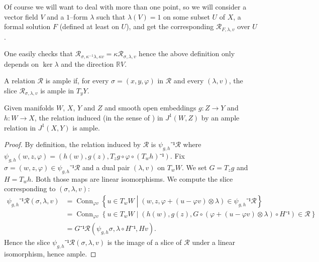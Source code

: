 \documentclass[10pt,a4paper]{article}
\newcommand{\Rel}{\mathcal{R}} %
\DeclareMathOperator{\Conn}{Conn} %
\newcommand{\uses}[1]{}
\newcommand{\lean}[1]{}
\newcommand{\leanok}{}
\begin{document}
Of course we will want to deal with more than one point, so we will consider a
vector field $V$ and a $1$--form $λ$ such that $λ(V) = 1$ on some subset $U$ of
$X$, a formal solution $F$ (defined at least on $U$), and get the corresponding
$\Rel_{F, λ, v}$ over $U$.

One easily checks that $\Rel_{σ, κ^{-1}λ, κv} = κ\Rel_{σ, λ, v}$ hence the above
definition only depends on $\ker λ$ and the direction $ℝV$.

\begin{definition}
  \label{def:ample_relation}
  \uses{def:one_jet_space, def:ample_subset}
  \leanok
  \lean{RelMfld.Ample}
  A relation $\Rel$ is ample if, for every $σ = (x, y, φ)$ in $\Rel$ and every
  $(λ, v)$, the slice $\Rel_{σ, λ, v}$ is ample in $T_yY$.
\end{definition}

\begin{lemma}
  \label{lem:ample_iff_loc}
  \uses{def:ample_relation, def:transfer_map}
  \leanok
  \lean{RelMfld.Ample.localize}
  Given manifolds $W$, $X$, $Y$ and $Z$ and smooth open embeddings $g : Z → Y$
  and $h : W → X$, the relation induced (in the sense of )
  in $J^1(W, Z)$ by an ample relation in $J^1(X, Y)$ is ample.
\end{lemma}

\begin{proof}
  \leanok
  By definition, the relation induced by $\Rel$ is
  $ψ_{g, h}⁻¹\Rel$ where
  $ψ_{g, h}(w, z, φ) = (h(w), g(z), T_zg ∘ φ ∘ (T_wh)⁻¹)$.
  Fix $σ =(w, z, φ) ∈ ψ_{g, h}⁻¹\Rel$
  and a dual pair $(λ, v)$ on $T_wW$. We set $G = T_z g$ and $H = T_w h$. Both
  those maps are linear isomorphisms. We compute the slice corresponding to $(σ, λ, v)$:
  \begin{align*}
    ψ_{g, h}⁻¹\Rel(σ, λ, v)
    &= \Conn_{φv}\left\{u ∈ T_wW \;\left|\; (w, z, φ + (u - φv)⊗λ) ∈ ψ_{g, h}⁻¹\Rel \right.\right\}\\
    &= \Conn_{φv}\left\{u ∈ T_wW \;\left|\; (h(w), g(z), G ∘ (φ + (u - φv)⊗λ)∘ H⁻¹) ∈ \Rel \right.\right\}\\
    &= G⁻¹\Rel(ψ_{g, h}σ, λ ∘ H⁻¹, Hv).
  \end{align*}
  Hence the slice $ψ_{g, h}⁻¹\Rel(σ, λ, v)$ is the image of a slice of $\Rel$
  under a linear isomorphism, hence ample.
\end{proof}
\end{document}
